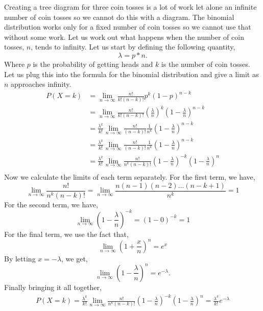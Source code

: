 \documentclass{article}
\begin{document}
Creating a tree diagram for three coin tosses is a lot of work let alone an infinite number of coin tosses so we cannot do this with a diagram. The binomial distribution works only for a fixed number of coin tosses so we cannot use that without some work. Let us work out what happens when the number of coin tosses, $n$, tends to infinity. Let us start by defining the following quantity, 
\begin{equation*}
    \lambda = p * n.
\end{equation*}
Where $p$ is the probability of getting heads and $k$ is the number of coin tosses. Let us plug this into the formula for the binomial distribution and give a limit as $n$ approaches infinity.
\begin{align*}
    P(X = k) & = \lim_{n \rightarrow \infty} \frac{n!}{k!(n - k)!}p^k(1 - p)^{n - k} \\
             & = \lim_{n \rightarrow \infty} \frac{n!}{k!(n - k)!} \left(\frac{\lambda}{n}\right)^k \left(1 - \frac{\lambda}{n} \right)^{n - k} \\
             & = \frac{\lambda ^ k}{k!} \lim_{n \rightarrow \infty} \frac{n!}{(n - k)!} \frac{1}{n^k} \left(1 - \frac{\lambda}{n} \right)^{n - k} \\
             & = \frac{\lambda ^ k}{k!} \lim_{n \rightarrow \infty} \frac{n!}{(n - k)!} \frac{1}{n^k} \left(1 - \frac{\lambda}{n} \right)^{n - k} \\
             & = \frac{\lambda ^ k}{k!} \lim_{n \rightarrow \infty} \frac{n!}{n^k(n - k)!} \left(1 - \frac{\lambda}{n}\right)^{-k}\left(1 - \frac{\lambda}{n} \right)^{n} \\
\end{align*}
Now we calculate the limits of each term separately. For the first term, we have,
\begin{equation*}
    \lim_{n \rightarrow \infty} \frac{n!}{n^k(n - k)!} = \lim_{n \rightarrow \infty} \frac{n(n-1)(n-2)\dots(n-k+1)}{n^k} = 1
\end{equation*}
For the second term, we have,
\begin{equation*}
    \lim_{n \rightarrow \infty} \left(1 - \frac{\lambda}{n}\right)^{-k} = (1 - 0) ^{-k} = 1
\end{equation*}
For the final term, we use the fact that,
\begin{equation}
    \lim_{n \rightarrow \infty} \left( 1 + \frac{x}{n} \right)^n = e^x
\end{equation}
By letting $x = - \lambda$, we get,
\begin{equation}
    \lim_{n \rightarrow \infty} \left( 1 - \frac{\lambda}{n} \right)^n = e^{-\lambda}.
\end{equation}
Finally bringing it all together,
\begin{align*}
P(X = k) = \frac{\lambda ^ k}{k!} \lim_{n \rightarrow \infty} \frac{n!}{n^k(n - k)!} \left(1 - \frac{\lambda}{n}\right)^{-k}\left(1 - \frac{\lambda}{n} \right)^{n} = \frac{\lambda ^ k}{k!} e ^ {-\lambda}
\end{align*}
\end{document}
